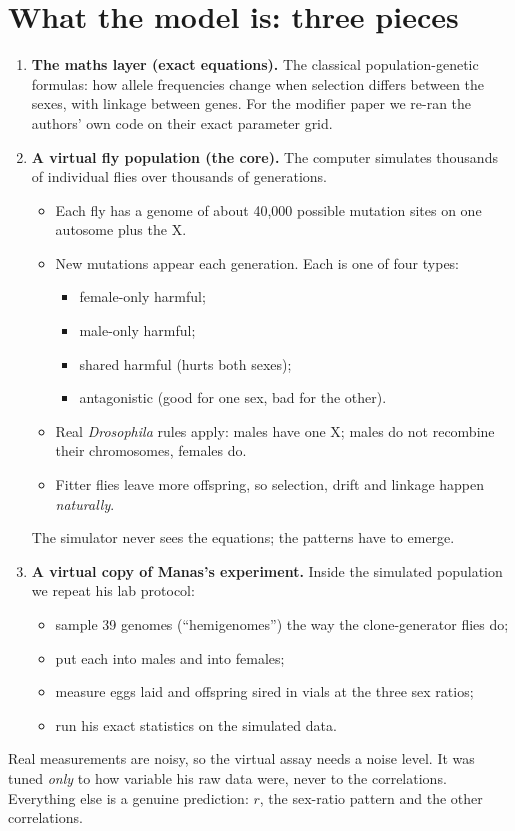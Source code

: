 \section{What the model is: three pieces}
\begin{enumerate}
\item \textbf{The maths layer (exact equations).} The classical population-genetic formulas: how allele frequencies change when selection differs between the sexes, with linkage between genes. For the modifier paper we re-ran the authors' own code on their exact parameter grid.
\item \textbf{A virtual fly population (the core).} The computer simulates thousands of individual flies over thousands of generations.
  \begin{itemize}
  \item Each fly has a genome of about 40,000 possible mutation sites on one autosome plus the X.
  \item New mutations appear each generation. Each is one of four types:
    \begin{itemize}
    \item female-only harmful;
    \item male-only harmful;
    \item shared harmful (hurts both sexes);
    \item antagonistic (good for one sex, bad for the other).
    \end{itemize}
  \item Real \emph{Drosophila} rules apply: males have one X; males do not recombine their chromosomes, females do.
  \item Fitter flies leave more offspring, so selection, drift and linkage happen \emph{naturally}.
  \end{itemize}
  The simulator never sees the equations; the patterns have to emerge.
\item \textbf{A virtual copy of Manas's experiment.} Inside the simulated population we repeat his lab protocol:
  \begin{itemize}
  \item sample 39 genomes (``hemigenomes'') the way the clone-generator flies do;
  \item put each into males and into females;
  \item measure eggs laid and offspring sired in vials at the three sex ratios;
  \item run his exact statistics on the simulated data.
  \end{itemize}
\end{enumerate}
\begin{keybox}
Real measurements are noisy, so the virtual assay needs a noise level. It was tuned \emph{only} to how variable his raw data were, never to the correlations. Everything else is a genuine prediction: $r$, the sex-ratio pattern and the other correlations.
\end{keybox}

